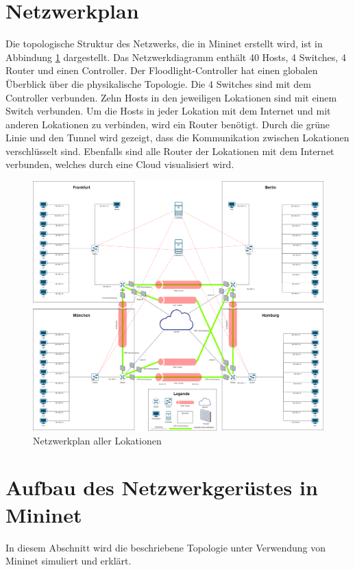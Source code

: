 \documentclass[fontsize=12pt,paper=a4,open=any,parskip=half,
  twoside=false,toc=listof,toc=bibliography,fleqn,leqno,
  captions=nooneline,captions=tableabove,british]{scrbook}
\begin{document}
\section{Netzwerkplan}
Die topologische Struktur des Netzwerks, die in Mininet erstellt wird, ist in Abbindung \ref{netzwerkplan} dargestellt. Das Netzwerkdiagramm enthält 40 Hosts, 4 Switches, 4 Router und einen Controller. Der Floodlight-Controller hat einen globalen Überblick über die physikalische Topologie. Die 4 Switches sind mit dem Controller verbunden. Zehn Hosts in den jeweiligen Lokationen sind mit einem Switch verbunden. Um die Hosts in jeder Lokation mit dem Internet und mit anderen Lokationen zu verbinden, wird ein Router benötigt. Durch die grüne Linie und den Tunnel wird gezeigt, dass die Kommunikation zwischen Lokationen verschlüsselt sind. Ebenfalls sind alle Router der Lokationen mit dem Internet verbunden, welches durch eine Cloud visualisiert wird.

\begin{figure}[H]
 \centering
 \includegraphics[width=1.0\textwidth]{Bilder/netzwerkplan}
 \captionsetup{justification=centering,margin=1cm}
 \caption{Netzwerkplan aller Lokationen}
 \label{netzwerkplan}
\end{figure}

\section{Aufbau des Netzwerkgerüstes in Mininet}
In diesem Abschnitt wird die beschriebene Topologie unter Verwendung von Mininet simuliert und erklärt.
\end{document}
